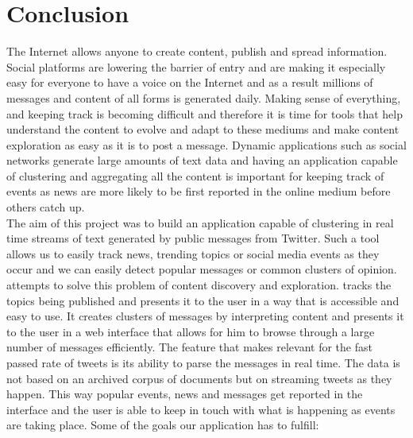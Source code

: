 \chapter{Conclusion}
\label{chapter:conclusion}

The Internet allows anyone to create content, publish and spread information. Social platforms are lowering the barrier of entry and are making it especially easy for everyone to have a voice on the Internet and as a result millions of messages and content of all forms is generated daily. Making sense of everything, and keeping track is becoming difficult and therefore it is time for tools that help understand the content to evolve and adapt to these mediums and make content exploration as easy as it is to post a message.
\newline
Dynamic applications such as social networks generate large amounts of text data and having an application capable of clustering and aggregating all the content is important for keeping track of events as news are more likely to be first reported in the online medium before others catch up.
\newline\\
The aim of this project was to build an application capable of clustering in real time streams of text generated by public messages from Twitter. Such a tool allows us to easily track news, trending topics or social media events as they occur and we can easily detect popular messages or common clusters of opinion.
\newline
{\project}  attempts to solve this problem of content discovery and exploration. {\project}  tracks the topics being published and presents it to the user in a way that is accessible and easy to use. It creates clusters of messages by interpreting content and presents it to the user in a web interface that allows for him to browse through a large number of messages efficiently.
\newline
The feature that makes {\project}  relevant for the fast passed rate of tweets is its ability to parse the messages in real time. The data is not based on an archived corpus of documents but on streaming tweets as they happen. This way popular events, news and messages get reported in the interface and the user is able to keep in touch with what is happening as events are taking place.
\newline
Some of the goals our application has to fulfill:
